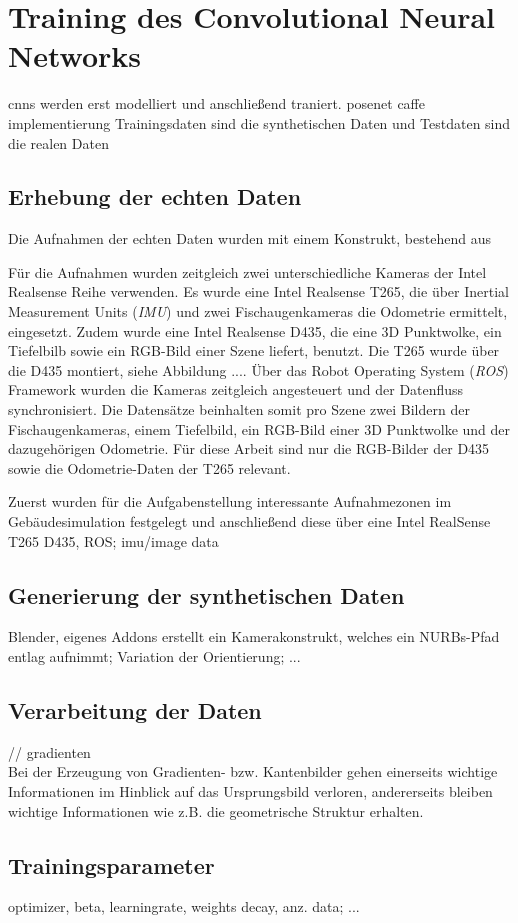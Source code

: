 
\section{Training des Convolutional Neural Networks}
cnns werden erst modelliert und anschließend traniert.
posenet caffe implementierung
Trainingsdaten sind die synthetischen Daten und Testdaten sind die realen Daten

\subsection{Erhebung der echten Daten}

Die Aufnahmen der echten Daten wurden mit einem Konstrukt, bestehend aus 

Für die Aufnahmen wurden zeitgleich zwei unterschiedliche Kameras der Intel Realsense Reihe verwenden. Es wurde eine Intel Realsense T265, die über Inertial Measurement Units (\textit{IMU}) und zwei Fischaugenkameras die Odometrie ermittelt, eingesetzt. Zudem wurde eine Intel Realsense D435, die eine 3D Punktwolke, ein Tiefelbilb sowie ein RGB-Bild einer Szene liefert, benutzt. Die T265 wurde über die D435 montiert, siehe Abbildung .... Über das Robot Operating System (\textit{ROS}) Framework wurden die Kameras zeitgleich angesteuert und der Datenfluss synchronisiert. Die Datensätze beinhalten somit pro Szene zwei Bildern der Fischaugenkameras, einem Tiefelbild, ein RGB-Bild einer 3D Punktwolke und der dazugehörigen Odometrie. Für diese Arbeit sind nur die RGB-Bilder der D435 sowie die Odometrie-Daten der T265 relevant.

Zuerst wurden für die Aufgabenstellung interessante Aufnahmezonen im Gebäudesimulation festgelegt und anschließend diese über eine
Intel RealSense T265 D435, ROS; imu/image data


\subsection{Generierung der synthetischen Daten}
Blender,
eigenes Addons erstellt ein Kamerakonstrukt, welches ein NURBs-Pfad entlag aufnimmt; Variation der Orientierung; ...

\subsection{Verarbeitung der Daten}
// gradienten\\
Bei der Erzeugung von Gradienten- bzw. Kantenbilder gehen einerseits wichtige Informationen im Hinblick auf das Ursprungsbild verloren, andererseits bleiben wichtige Informationen wie z.B. die geometrische Struktur erhalten.

\subsection{Trainingsparameter}
optimizer, beta,
learningrate,
weights decay, anz. data; ...